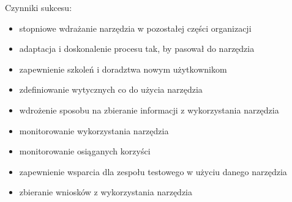 \documentclass[../main.tex]{subfiles}
\begin{document}
    Czynniki sukcesu:
    \begin{itemize}
        \item stopniowe wdrażanie narzędzia w pozostałej części organizacji
        \item adaptacja i doskonalenie procesu tak, by pasował do narzędzia
        \item zapewnienie szkoleń i doradztwa nowym użytkownikom
        \item zdefiniowanie wytycznych co do użycia narzędzia
        \item wdrożenie sposobu na zbieranie informacji z wykorzystania narzędzia
        \item monitorowanie wykorzystania narzędzia
        \item monitorowanie osiąganych korzyści
        \item zapewnienie wsparcia dla zespołu testowego w użyciu danego narzędzia
        \item zbieranie wniosków z wykorzystania narzędzia
    \end{itemize}
\end{document}
